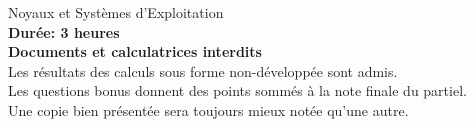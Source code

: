 %
%
%
%
%
%
%

%
%

\def\path{../../..}

%
%



\newcommand{\class}{NSE}
\newcommand{\examdate}{2014}
\newcommand{\timelimit}{3h}
\newcommand{\school}{EPITA}

%
%


%
%

\begin{center}
  {\LARGE Noyaux et Systèmes d'Exploitation}\\
  \vspace{1cm}
  \textbf{Durée: 3 heures}\\
  \textbf{Documents et calculatrices interdits}\\
  \scriptsize{Les résultats des calculs sous forme non-développée sont admis.}\\
  \scriptsize{Les questions bonus donnent des points sommés à la note finale du partiel.}\\
  \scriptsize{Une copie bien présentée sera toujours mieux notée qu'une autre.}
\end{center}
\vspace{1cm}

%
%

